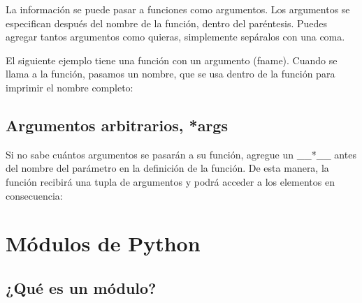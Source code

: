 La información se puede pasar a funciones como argumentos. Los
argumentos se especifican después del nombre de la función, dentro del
paréntesis. Puedes agregar tantos argumentos como quieras, simplemente
sepáralos con una coma.

El siguiente ejemplo tiene una función con un argumento (fname). Cuando
se llama a la función, pasamos un nombre, que se usa dentro de la
función para imprimir el nombre completo:

\begin{Shaded}
\begin{Highlighting}[]
    \OperatorTok{+} \NormalTok{)}

\NormalTok{)}
\NormalTok{)}
\NormalTok{)}
\end{Highlighting}
\end{Shaded}

\subsection{Argumentos arbitrarios,
*args}\label{argumentos-arbitrarios-args}

Si no sabe cuántos argumentos se pasarán a su función, agregue un
\_\_*\_\_ antes del nombre del parámetro en la definición de la función.
De esta manera, la función recibirá una tupla de argumentos y podrá
acceder a los elementos en consecuencia:

\begin{Shaded}
\begin{Highlighting}[]
\OperatorTok{*}
    \NormalTok{(} \OperatorTok{+}\NormalTok{ ninos[}\NormalTok{])}

\NormalTok{, }\NormalTok{, }\NormalTok{)}
\end{Highlighting}
\end{Shaded}

\section{Módulos de Python}\label{muxf3dulos-de-python}

\subsection{¿Qué es un módulo?}\label{quuxe9-es-un-muxf3dulo}

